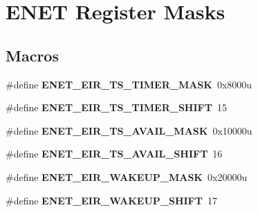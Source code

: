 \hypertarget{group__ENET__Register__Masks}{}\section{E\+N\+ET Register Masks}
\label{group__ENET__Register__Masks}
\subsection*{Macros}
\begin{DoxyCompactItemize}
\item 
\#define {\bfseries E\+N\+E\+T\+\_\+\+E\+I\+R\+\_\+\+T\+S\+\_\+\+T\+I\+M\+E\+R\+\_\+\+M\+A\+SK}~0x8000u\hypertarget{group__ENET__Register__Masks_gabded92ce4206647b27b1107db2bb5088}{}\label{group__ENET__Register__Masks_gabded92ce4206647b27b1107db2bb5088}

\item 
\#define {\bfseries E\+N\+E\+T\+\_\+\+E\+I\+R\+\_\+\+T\+S\+\_\+\+T\+I\+M\+E\+R\+\_\+\+S\+H\+I\+FT}~15\hypertarget{group__ENET__Register__Masks_ga40800c9bb4d99721c93e7d7031f96300}{}\label{group__ENET__Register__Masks_ga40800c9bb4d99721c93e7d7031f96300}

\item 
\#define {\bfseries E\+N\+E\+T\+\_\+\+E\+I\+R\+\_\+\+T\+S\+\_\+\+A\+V\+A\+I\+L\+\_\+\+M\+A\+SK}~0x10000u\hypertarget{group__ENET__Register__Masks_gae746d0a643c9d6e39e07623a1d944acc}{}\label{group__ENET__Register__Masks_gae746d0a643c9d6e39e07623a1d944acc}

\item 
\#define {\bfseries E\+N\+E\+T\+\_\+\+E\+I\+R\+\_\+\+T\+S\+\_\+\+A\+V\+A\+I\+L\+\_\+\+S\+H\+I\+FT}~16\hypertarget{group__ENET__Register__Masks_gad811839fe8168bdb1e55007a785d132b}{}\label{group__ENET__Register__Masks_gad811839fe8168bdb1e55007a785d132b}

\item 
\#define {\bfseries E\+N\+E\+T\+\_\+\+E\+I\+R\+\_\+\+W\+A\+K\+E\+U\+P\+\_\+\+M\+A\+SK}~0x20000u\hypertarget{group__ENET__Register__Masks_ga0fbd5b05a2c5421000b0a2aa1ee1565a}{}\label{group__ENET__Register__Masks_ga0fbd5b05a2c5421000b0a2aa1ee1565a}

\item 
\#define {\bfseries E\+N\+E\+T\+\_\+\+E\+I\+R\+\_\+\+W\+A\+K\+E\+U\+P\+\_\+\+S\+H\+I\+FT}~17\hypertarget{group__ENET__Register__Masks_gaca3f3ef47646913b04686a282364408d}{}\label{group__ENET__Register__Masks_gaca3f3ef47646913b04686a282364408d}


\end{DoxyCompactItemize}
